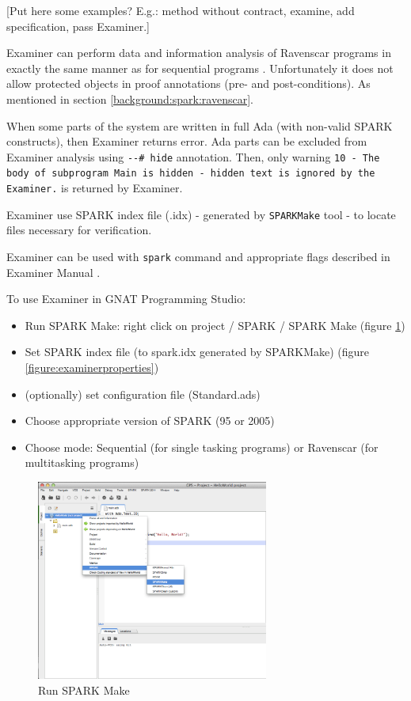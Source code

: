 [Put here some examples? E.g.: method without contract, examine, add specification, pass Examiner.]

Examiner can perform data and information analysis of Ravenscar programs in exactly the same manner as for sequential programs \cite{Ravenscar:Online}. Unfortunately it does not allow protected objects in proof annotations (pre- and post-conditions). As mentioned in section \ref{background:spark:ravenscar}.

When some parts of the system are written in full Ada (with non-valid SPARK constructs), then Examiner returns error. Ada parts can be excluded from Examiner analysis using \lstinline{--# hide} annotation. Then, only warning \lstinline{10 - The body of subprogram Main is hidden - hidden text is ignored by the Examiner.} is returned by Examiner.

Examiner use SPARK index file (.idx) - generated by \lstinline{SPARKMake} tool -  to locate files necessary for verification. \cite{Barnes:Book}

Examiner can be used with \lstinline{spark} command and appropriate flags described in Examiner Manual \cite{Examiner:Online}.


To use Examiner in GNAT Programming Studio:
\begin{itemize}
	\item Run SPARK Make: right click on project / SPARK / SPARK Make (figure \ref{figure:sparkmake})
	\item Set SPARK index file (to spark.idx generated by SPARKMake) (figure \ref{figure:examinerproperties})
	\item (optionally) set configuration file (Standard.ads)
	\item Choose appropriate version of SPARK (95 or 2005)
	\item Choose mode: Sequential (for single tasking programs) or Ravenscar (for multitasking programs)
\end{itemize}

\begin{figure}[ht]%
    \begin{center}
    	\includegraphics[width=3in]{figures/SPARKMake.png}
    	\caption{Run SPARK Make}
    \end{center}
    \label{figure:sparkmake}
\end{figure}

